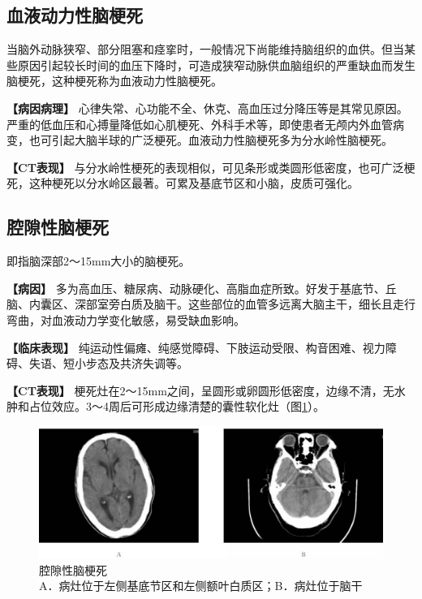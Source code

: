 \subsection{血液动力性脑梗死}

当脑外动脉狭窄、部分阻塞和痉挛时，一般情况下尚能维持脑组织的血供。但当某些原因引起较长时间的血压下降时，可造成狭窄动脉供血脑组织的严重缺血而发生脑梗死，这种梗死称为血液动力性脑梗死。

\textbf{【病因病理】}
心律失常、心功能不全、休克、高血压过分降压等是其常见原因。严重的低血压和心搏量降低如心肌梗死、外科手术等，即使患者无颅内外血管病变，也可引起大脑半球的广泛梗死。血液动力性脑梗死多为分水岭性脑梗死。

\textbf{【CT表现】}
与分水岭性梗死的表现相似，可见条形或类圆形低密度，也可广泛梗死，这种梗死以分水岭区最著。可累及基底节区和小脑，皮质可强化。

\subsection{腔隙性脑梗死}

即指脑深部2～15mm大小的脑梗死。

\textbf{【病因】}
多为高血压、糖尿病、动脉硬化、高脂血症所致。好发于基底节、丘脑、内囊区、深部室旁白质及脑干。这些部位的血管多远离大脑主干，细长且走行弯曲，对血液动力学变化敏感，易受缺血影响。

\textbf{【临床表现】}
纯运动性偏瘫、纯感觉障碍、下肢运动受限、构音困难、视力障碍、失语、短小步态及共济失调等。

\textbf{【CT表现】}
梗死灶在2～15mm之间，呈圆形或卵圆形低密度，边缘不清，无水肿和占位效应。3～4周后可形成边缘清楚的囊性软化灶（图\ref{fig2-22}）。

\begin{figure}[!htbp]
 \centering
 \includegraphics[width=.7\textwidth,height=\textheight,keepaspectratio]{./images/Image00040.jpg}
 \captionsetup{justification=centering}
 \caption{腔隙性脑梗死\\{\small A．病灶位于左侧基底节区和左侧额叶白质区；B．病灶位于脑干}}
 \label{fig2-22}
  \end{figure} 


